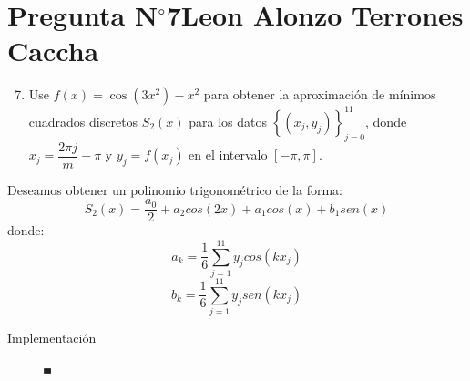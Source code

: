 \section{Pregunta N$^{\circ}$7\qquad Leon Alonzo Terrones Caccha}

\begin{frame}
    \begin{enumerate}\setcounter{enumi}{6}
        \item

              Use
              \begin{math}
                  f\left(x\right)=
                  \cos\left(3x^{2}\right)-
                  x^{2}
              \end{math}
              para obtener la aproximación de mínimos cuadrados
              discretos $S_{2}\left(x\right)$ para los datos
              \begin{math}
                  \left\{
                  \left(x_{j},y_{j}\right)
                  \right\}_{j=0}^{11}
              \end{math},
              donde $x_{j}=\dfrac{2\pi j}{m}-\pi$ y
              $y_{j}=f\left(x_{j}\right)$ en el intervalo
              $\left[-\pi,\pi\right]$.
    \end{enumerate}

    \begin{solution}
        Deseamos obtener un polinomio trigonométrico de la forma:
        \[S_{2}\left(x\right)=\frac{a_{0}}{2}+a_{2}cos(2x)+a_1cos(x)+b_1sen(x)\]
        donde:
        \[a_k=\frac{1}{6}\sum_{j=1}^{11}{y_jcos(kx_j)}\]
        \[b_k=\frac{1}{6}\sum_{j=1}^{11}{y_jsen(kx_j)}\]
    \end{solution}
\end{frame}
\begin{frame}{Implementación}
    \begin{figure}
        \centering
        \includegraphics[width=8]{p7-code1.png}
        \caption{}
        \label{fig:enter-label}
    \end{figure}
\end{frame}

